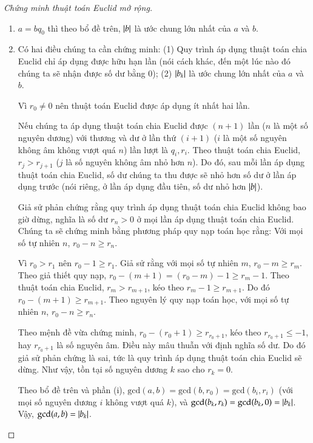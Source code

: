 \begin{proof}[Chứng minh thuật toán Euclid mở rộng]
    \begin{enumerate}[label={(\roman*)}]
        \item $a = b q_{0}$ thì theo bổ đề trên, $\left\vert{b}\right\vert$ là ước chung lớn nhất của $a$ và $b$.

        \item Có hai điều chúng ta cần chứng minh: (1) Quy trình áp dụng thuật toán chia Euclid chỉ áp dụng được hữu hạn lần (nói cách khác, đến một lúc nào đó chúng ta sẽ nhận được số dư bằng $0$); (2) $\left\vert{b_{k}}\right\vert$ là ước chung lớn nhất của $a$ và $b$.

              Vì $r_{0}\ne 0$ nên thuật toán Euclid được áp dụng ít nhất hai lần.

              Nếu chúng ta áp dụng thuật toán chia Euclid được $(n+1)$ lần ($n$ là một số nguyên dương) với thương và dư ở lần thứ $(i+1)$ ($i$ là một số nguyên không âm không vượt quá $n$) lần lượt là $q_{i}, r_{i}$. Theo thuật toán chia Euclid, $r_{j} > r_{j+1}$ ($j$ là số nguyên không âm nhỏ hơn $n$). Do đó, sau mỗi lần áp dụng thuật toán chia Euclid, số dư chúng ta thu được sẽ nhỏ hơn số dư ở lần áp dụng trước (nói riêng, ở lần áp dụng đầu tiên, số dư nhỏ hơn $\left\vert{b}\right\vert$).

              Giả sử phản chứng rằng quy trình áp dụng thuật toán chia Euclid không bao giờ dừng, nghĩa là số dư $r_{n} > 0$ ở mọi lần áp dụng thuật toán chia Euclid. Chúng ta sẽ chứng minh bằng phương pháp quy nạp toán học rằng: Với mọi số tự nhiên $n$, $r_{0} - n\geq r_{n}$.

              Vì $r_{0} > r_{1}$ nên $r_{0} - 1\geq r_{1}$. Giả sử rằng với mọi số tự nhiên $m$, $r_{0} - m\geq r_{m}$. Theo giả thiết quy nạp, $r_{0} - (m + 1) = (r_{0} - m) - 1 \geq r_{m} - 1$. Theo thuật toán chia Euclid, $r_{m} > r_{m+1}$, kéo theo $r_{m} - 1\geq r_{m+1}$. Do đó $r_{0} - (m + 1)\geq r_{m+1}$. Theo nguyên lý quy nạp toán học, với mọi số tự nhiên $n$, $r_{0} - n\geq r_{n}$.

              Theo mệnh đề vừa chứng minh, $r_{0} - (r_{0} + 1)\geq r_{r_{0} + 1}$, kéo theo $r_{r_{0} + 1}\leq -1$, hay $r_{r_{0} + 1}$ là số nguyên âm. Điều này mâu thuẫn với định nghĩa số dư. Do đó giả sử phản chứng là sai, tức là quy trình áp dụng thuật toán chia Euclid sẽ dừng. Như vậy, tồn tại số nguyên dương $k$ sao cho $r_{k} = 0$.

              Theo bổ đề trên và phần (i), $\text{gcd}(a, b) = \text{gcd}(b, r_{0}) = \text{gcd}(b_{i}, r_{i})$ (với mọi số nguyên dương $i$ không vượt quá $k$), và $\text{gcd}(b_{k}, r_{k}) = \text{gcd}(b_{k}, 0) = \left\vert{b_{k}}\right\vert$. Vậy, $\text{gcd}(a, b) = \left\vert{b_{k}}\right\vert$.\qedhere
    \end{enumerate}
\end{proof}

